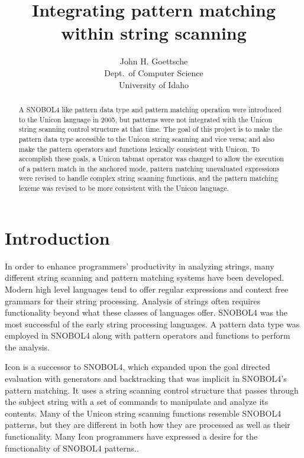 \documentclass{article}
\begin{document}
\linespread{1}
\title{Integrating pattern matching\\
within string scanning}
\author{John H. Goettsche\\
  Dept.\ of Computer Science\\
  University of Idaho}

\maketitle

\begin{abstract}
A SNOBOL4 like pattern data type and pattern matching operation were introduced to the Unicon language in 2005, but patterns were not integrated with the Unicon string scanning control structure at that time.  The goal of this project is to make the pattern data type accessible to the Unicon string scanning and vice versa; and also make the pattern operators and functions lexically consistent with Unicon.  To accomplish these goals, a Unicon tabmat operator was changed to allow the execution of a pattern match in the anchored mode, pattern matching unevaluated expressions were revised to handle complex string scanning functions, and the pattern matching lexeme was revised to be more consistent with the Unicon language.

\end{abstract}

\pagebreak
\linespread{1}
\tableofcontents

\pagebreak
\section{Introduction}
In order to enhance programmers' productivity in analyzing strings, many different string scanning and pattern matching systems have been developed.  Modern high level languages tend to offer regular expressions and context free grammars for their string processing.  Analysis of strings often requires functionality beyond what these classes of languages offer.  SNOBOL4 was the most successful of the early string processing languages. \cite{Snobol, Gaikaiwari2005}  A pattern data type was employed in SNOBOL4 along with pattern operators and functions to perform the analysis.

Icon is a successor to SNOBOL4, which expanded upon the goal directed evaluation with generators and backtracking that was implicit in SNOBOL4's pattern matching.\cite{GriswoldIcon, Gaikaiwari2005}  It uses a string scanning control structure that passes through the subject string with a set of commands to manipulate and analyze its contents.  Many of the Unicon string scanning functions resemble SNOBOL4 patterns, but they are different in both how they are processed as well as their functionality.  Many Icon programmers have expressed a desire for the functionality of SNOBOL4 patterns.\cite{Griswold1980}.
\end{document}
